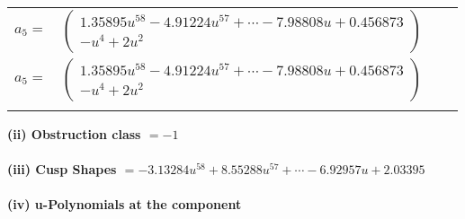 \documentclass[1p]{elsarticle_modified}
\theoremstyle{definition}
\begin{document}
\begin{tabular}{m{7pt} m{180pt} m{7pt} m{180pt} }
\flushright $a_{5}=$&$\begin{pmatrix}1.35895 u^{58}-4.91224 u^{57}+\cdots-7.98808 u+0.456873\\- u^4+2 u^2\end{pmatrix}$\\ \flushright $a_{5}=$&$\begin{pmatrix}1.35895 u^{58}-4.91224 u^{57}+\cdots-7.98808 u+0.456873\\- u^4+2 u^2\end{pmatrix}$\\&\end{tabular}
\flushleft \textbf{(ii) Obstruction class $= -1$}\\~\\
\flushleft \textbf{(iii) Cusp Shapes $= -3.13284 u^{58}+8.55288 u^{57}+\cdots-6.92957 u+2.03395$}\\~\\
\newpage\renewcommand{\arraystretch}{1}
\flushleft \textbf{(iv) u-Polynomials at the component}\newline \\
\end{document}
